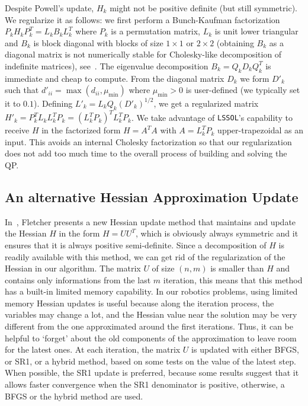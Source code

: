 Despite Powell's update, $H_{k}$ might not be positive definite (but still symmetric).
We regularize it as follows: we first perform a Bunch-Kaufman factorization $P_k H_k P_k^T= L_k B_k L_k^T$ where $P_k$ is a permutation matrix, $L_k$ is unit lower triangular and $B_k$ is block diagonal with blocks of size $1 \times 1$ or $2\times 2$ (obtaining $B_k$ as a diagonal matrix is not numerically stable for Cholesky-like decomposition of indefinite matrices), see~\cite{golub:book:1996}.
The eigenvalue decomposition $B_k = Q_k D_k Q_k^T$ is immediate and cheap to compute.
From the diagonal matrix $D_k$ we form $D'_k$ such that $d'_{ii} = \max\left(d_{ii},\mu_{\min}\right)$ where $\mu_{\min}>0$ is user-defined (we typically set it to $0.1$).
Defining $L'_k = L_k Q_k {(D'_k)}^{1/2}$, we get a regularized matrix $H'_k = P_k^T L_k L_k^T P_k = (L_k^T P_k)^T L_k^T P_k$.
We take advantage of {\tt LSSOL}'s capability to receive $H$ in the factorized form $H=A^TA$ with $A=L_k^T P_k$ upper-trapezoidal as an input.
This avoids an internal Cholesky factorization so that our regularization does not add too much time to the overall process of building and solving the QP.\@

\subsection{An alternative Hessian Approximation Update}
\label{sub:an_alternative_hessian_approximation_update}

In~\cite{Fletcher:ifip:2006}, Fletcher presents a new Hessian update method that maintains and update the Hessian $H$ in the form $H=U U^T$, which is obviously always symmetric and it ensures that it is always positive semi-definite.
Since a decomposition of $H$ is readily available with this method, we can get rid of the regularization of the Hessian in our algorithm.
The matrix $U$ of size $(n,m)$ is smaller than $H$ and contains only informations from the last $m$ iteration, this means that this method has a built-in limited memory capability.
In our robotics problems, using limited memory Hessian updates is useful because along the iteration process, the variables may change a lot, and the Hessian value near the solution may be very different from the one approximated around the first iterations.
Thus, it can be helpful to `forget' about the old components of the approximation to leave room for the latest ones.
At each iteration, the matrix $U$ is updated with either BFGS, or SR1, or a hybrid method, based on some tests on the value of the latest step.
When possible, the SR1 update is preferred, because some results suggest that it allows faster convergence when the SR1 denominator is positive, otherwise, a BFGS or the hybrid method are used.


